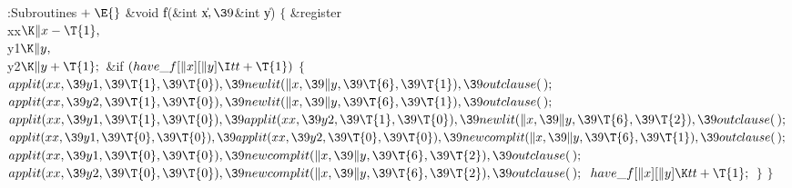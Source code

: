 \Y\B\4:Subroutines\X${}\mathrel+\E{}$\6
\&{void} \|f(\&{int} \|x${},\39{}$\&{int} \|y)\1\1\2\2\6
${}\{{}$\1\6
\&{register} \\{xx}${}\K\|x-\T{1},{}$ \\{y1}${}\K\|y,{}$ \\{y2}${}\K\|y+%
\T{1};{}$\7
\&{if} ${}(\\{have\_f}[\|x][\|y]\I\\{tt}+\T{1}){}$\5
${}\{{}$\1\6
${}\\{applit}(\\{xx},\39\\{y1},\39\T{1},\39\T{0}),\39\\{newlit}(\|x,\39\|y,\39%
\T{6},\39\T{1}),\39\\{outclause}(\,);{}$\6
${}\\{applit}(\\{xx},\39\\{y2},\39\T{1},\39\T{0}),\39\\{newlit}(\|x,\39\|y,\39%
\T{6},\39\T{1}),\39\\{outclause}(\,);{}$\6
${}\\{applit}(\\{xx},\39\\{y1},\39\T{1},\39\T{0}),\39\\{applit}(\\{xx},\39%
\\{y2},\39\T{1},\39\T{0}),\39\\{newlit}(\|x,\39\|y,\39\T{6},\39\T{2}),\39%
\\{outclause}(\,);{}$\6
${}\\{applit}(\\{xx},\39\\{y1},\39\T{0},\39\T{0}),\39\\{applit}(\\{xx},\39%
\\{y2},\39\T{0},\39\T{0}),\39\\{newcomplit}(\|x,\39\|y,\39\T{6},\39\T{1}),\39%
\\{outclause}(\,);{}$\6
${}\\{applit}(\\{xx},\39\\{y1},\39\T{0},\39\T{0}),\39\\{newcomplit}(\|x,\39\|y,%
\39\T{6},\39\T{2}),\39\\{outclause}(\,);{}$\6
${}\\{applit}(\\{xx},\39\\{y2},\39\T{0},\39\T{0}),\39\\{newcomplit}(\|x,\39\|y,%
\39\T{6},\39\T{2}),\39\\{outclause}(\,);{}$\6
${}\\{have\_f}[\|x][\|y]\K\\{tt}+\T{1};{}$\6
\4${}\}{}$\2\6
\4${}\}{}$\2\par
\fi

